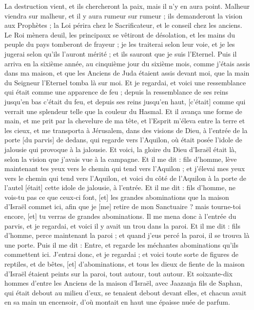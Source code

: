 \begin{multicols}{2}
La destruction vient, et ils chercheront la paix, mais il n'y en aura point.
Malheur viendra sur malheur, et il y aura rumeur sur rumeur ; ils demanderont la vision aux Prophètes ; la Loi périra chez le Sacrificateur, et le conseil chez les anciens.
Le Roi mènera deuil, les principaux se vêtiront de désolation, et les mains du peuple du pays tomberont de frayeur ; je les traiterai selon leur voie, et je les jugerai selon qu'ils l'auront mérité ; et ils sauront que je suis l'Eternel.
\VerseOne{}Puis il arriva en la sixième année, au cinquième jour du sixième mois, comme j'étais assis dans ma maison, et que les Anciens de Juda étaient assis devant moi, que la main du Seigneur l'Eternel tomba là sur moi.
Et je regardai, et voici une ressemblance qui était comme une apparence de feu ; depuis la ressemblance de ses reins jusqu'en bas c'était du feu, et depuis ses reins jusqu'en haut, [c'était] comme qui verrait une splendeur telle que la couleur du Hasmal.
Et il avança une forme de main, et me prit par la chevelure de ma tête, et l'Esprit m'éleva entre la terre et les cieux, et me transporta à Jérusalem, dans des visions de Dieu, à l'entrée de la porte [du parvis] de dedans, qui regarde vers l'Aquilon, où était posée l'idole de jalousie qui provoque à la jalousie.
Et voici, la gloire du Dieu d'Israël était là, selon la vision que j'avais vue à la campagne.
Et il me dit : fils d'homme, lève maintenant tes yeux vers le chemin qui tend vers l'Aquilon ; et j'élevai mes yeux vers le chemin qui tend vers l'Aquilon, et voici du côté de l'Aquilon à la porte de l'autel [était] cette idole de jalousie, à l'entrée.
Et il me dit : fils d'homme, ne vois-tu pas ce que ceux-ci font, [et] les grandes abominations que la maison d'Israël commet ici, afin que je [me] retire de mon Sanctuaire ? mais tourne-toi encore, [et] tu verras de grandes abominations.
Il me mena donc à l'entrée du parvis, et je regardai, et voici il y avait un trou dans la paroi.
Et il me dit : fils d'homme, perce maintenant la paroi ; et quand j'eus percé la paroi, il se trouva là une porte.
Puis il me dit : Entre, et regarde les méchantes abominations qu'ils commettent ici.
J'entrai donc, et je regardai ; et voici toute sorte de figures de reptiles, et de bêtes, [et] d'abominations, et tous les dieux de fiente de la maison d'Israël étaient peints sur la paroi, tout autour, tout autour.
Et soixante-dix hommes d'entre les Anciens de la maison d'Israël, avec Jaazanja fils de Saphan, qui était debout au milieu d'eux, se tenaient debout devant elles, et chacun avait en sa main un encensoir, d'où montait en haut une épaisse nuée de parfum.

\end{multicols}
